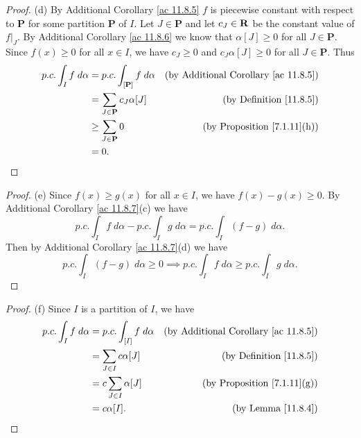 \begin{proof}{(d)}
    By Additional Corollary \ref{ac 11.8.5} \(f\) is piecewise constant with respect to \(\mathbf{P}\) for some partition \(\mathbf{P}\) of \(I\).
    Let \(J \in \mathbf{P}\) and let \(c_J \in \mathbf{R}\) be the constant value of \(f|_J\).
    By Additional Corollary \ref{ac 11.8.6} we know that \(\alpha[J] \geq 0\) for all \(J \in \mathbf{P}\).
    Since \(f(x) \geq 0\) for all \(x \in I\), we have \(c_J \geq 0\) and \(c_J \alpha[J] \geq 0\) for all \(J \in \mathbf{P}\).
    Thus
    \begin{align*}
        p.c. \int_I f \; d \alpha & = p.c. \int_{[\mathbf{P}]} f \; d \alpha & \text{(by Additional Corollary \ref{ac 11.8.5})} \\
                                  & = \sum_{J \in \mathbf{P}} c_J \alpha[J]  & \text{(by Definition \ref{11.8.5})}              \\
                                  & \geq \sum_{J \in \mathbf{P}} 0           & \text{(by Proposition \ref{7.1.11}(h))}          \\
                                  & = 0.
    \end{align*}
\end{proof}

\begin{proof}{(e)}
    Since \(f(x) \geq g(x)\) for all \(x \in I\), we have \(f(x) - g(x) \geq 0\).
    By Additional Corollary \ref{ac 11.8.7}(c) we have
    \[
        p.c. \int_I f \; d \alpha - p.c. \int_I g \; d \alpha = p.c. \int_I (f - g) \; d \alpha.
    \]
    Then by Additional Corollary \ref{ac 11.8.7}(d) we have
    \[
        p.c. \int_I (f - g) \; d \alpha \geq 0 \implies p.c. \int_I f \; d \alpha \geq p.c. \int_I g \; d \alpha.
    \]
\end{proof}

\begin{proof}{(f)}
    Since \(I\) is a partition of \(I\), we have
    \begin{align*}
        p.c. \int_I f \; d \alpha & = p.c. \int_{[I]} f \; d \alpha & \text{(by Additional Corollary \ref{ac 11.8.5})} \\
                                  & = \sum_{J \in I} c \alpha[J]    & \text{(by Definition \ref{11.8.5})}              \\
                                  & = c \sum_{J \in I} \alpha[J]    & \text{(by Proposition \ref{7.1.11}(g))}          \\
                                  & = c \alpha[I].                  & \text{(by Lemma \ref{11.8.4})}
    \end{align*}
\end{proof}

